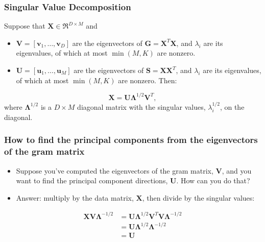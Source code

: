 \documentclass{beamer}
\begin{document}
\begin{frame}
  \frametitle{Singular Value Decomposition}
  
  Suppose that $\mathbf{X}\in\Re^{D\times M}$ and
  \begin{itemize}
  \item $\mathbf{V}=[\mathbf{v}_1,\ldots,\mathbf{v}_D]$ are the
    eigenvectors of $\mathbf{G}=\mathbf{X}^T\mathbf{X}$, and
    $\lambda_i$ are its eigenvalues, of which at most $\min(M,K)$ are
    nonzero.
  \item $\mathbf{U}=[\mathbf{u}_1,\ldots,\mathbf{u}_M]$ are the
    eigenvectors of $\mathbf{S}=\mathbf{X}\mathbf{X}^T$, and
    $\lambda_i$ are its eigenvalues, of which at most $\min(M,K)$ are
    nonzero.  Then:
  \end{itemize}
  \begin{displaymath}
    \mathbf{X}=\mathbf{U}\bm{\Lambda}^{1/2}\mathbf{V}^T,
  \end{displaymath}
  where $\bm{\Lambda}^{1/2}$ is a $D\times M$ diagonal matrix with
  the singular values, $\lambda_i^{1/2}$, on the diagonal.
\end{frame}

\begin{frame}
  \frametitle{How to find the principal components from the eigenvectors of the gram matrix}

  \begin{itemize}
  \item Suppose you've computed the eigenvectors of the gram matrix,
    $\mathbf{V}$, and you want to find the principal component
    directions, $\mathbf{U}$.  How can you do that?
  \item Answer: multiply by the data matrix, $\mathbf{X}$, then divide
    by the singular values:
  \end{itemize}
  \begin{align*}
    \mathbf{X}\mathbf{V}\bm{\Lambda}^{-1/2}
    &=\mathbf{U}\bm{\Lambda}^{1/2}\mathbf{V}^T\mathbf{V}\bm{\Lambda}^{-1/2}\\
    &=\mathbf{U}\bm{\Lambda}^{1/2}\bm{\Lambda}^{-1/2}\\
    &=\mathbf{U}
  \end{align*}
\end{frame}
\end{document}
